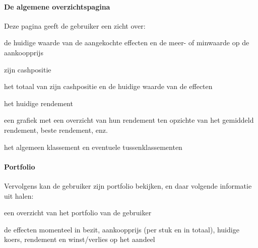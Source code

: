 \paragraph{De algemene overzichtspagina}
Deze pagina geeft de gebruiker een zicht over:
\begin{itemize_compact}
	\item{de huidige waarde van de aangekochte effecten en de meer- of minwaarde op de aankoopprijs}
	\item{zijn cashpositie}
	\item{het totaal van zijn cashpositie en de huidige waarde van de effecten}
	\item{het huidige rendement}
	\item{een grafiek met een overzicht van hun rendement ten opzichte van het gemiddeld rendement, beste rendement, enz.}
	\item{het algemeen klassement en eventuele tussenklassementen}
\end{itemize_compact}

\paragraph{Portfolio}
Vervolgens kan de gebruiker zijn portfolio bekijken, en daar volgende informatie uit halen:
\begin{itemize_compact}
	\item{een overzicht van het portfolio van de gebruiker}
	\item{de effecten momenteel in bezit, aankoopprijs (per stuk en in totaal), huidige koers, rendement en winst/verlies op het aandeel}
\end{itemize_compact}

